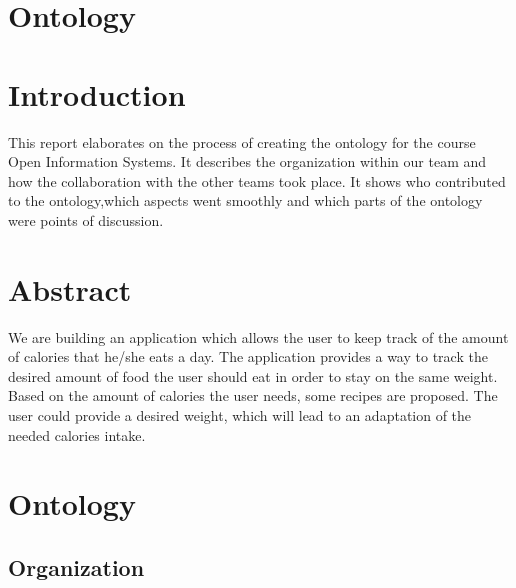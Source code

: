 

\maketitlepage
\section{Ontology}
\section{Introduction}
This report elaborates on the process of creating the ontology for the course Open Information Systems. It describes the organization within our team and how the collaboration with the other teams took place. It shows who contributed to the ontology,which aspects went smoothly and which parts of the ontology were points of discussion.  


\section{Abstract}
We are building an application which allows the user to keep track of the amount of calories that he/she eats a day.  The application provides a way to track the desired amount of food the user should eat in order to stay on the same weight. Based on the amount of calories the user needs, some recipes are proposed. The user could provide a desired weight, which will lead to an adaptation of the needed calories intake.

\newpage

\section{Ontology}

\subsection{Organization}

